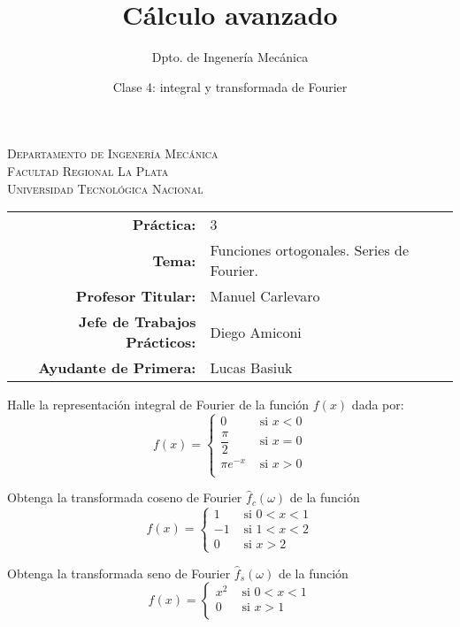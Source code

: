 \documentclass[11pt]{article}
\title{Cálculo avanzado}
\author{Dpto. de Ingenería Mecánica}
\date{Clase 4: integral y transformada de Fourier}
\begin{document}

\begin{center}
\end{center} 

\begin{center}
\vspace{\baselineskip}
\Large{\textsc{Departamento de Ingenería Mecánica}} \\
\textsc{Facultad Regional La Plata} \\
\textsc{Universidad Tecnológica Nacional}
\end{center}


\begin{center}
\begin{tabular}{r l}
    \textbf{Práctica:} & 3 \\
 \textbf{Tema:} & Funciones ortogonales. Series de Fourier. \\
 \textbf{Profesor Titular:} & Manuel Carlevaro \\
 \textbf{Jefe de Trabajos Prácticos:} & Diego Amiconi \\
 \textbf{Ayudante de Primera:} & Lucas Basiuk 
\end{tabular}\end{center}

\vspace{1em}

\begin{question} %
Halle la representación integral de Fourier de la función $f(x)$ dada por:
\[ f(x) = 
    \begin{cases}
    0 & \text{ si } x < 0 \\
    \dfrac{\pi}{2} & \text{ si } x = 0 \\
    \pi e^{-x} & \text{ si } x > 0 \\
\end{cases} \]
\end{question}


\begin{question} %
Obtenga la transformada coseno de Fourier $\hat{f}_c(\omega)$ de la función
\[ f(x) = 
\begin{cases}
    1 & \text{ si } 0 < x < 1 \\
    -1 & \text{ si } 1 < x < 2 \\
    0 & \text{ si } x > 2 
\end{cases} \]
\end{question}


\begin{question} %
Obtenga la transformada seno de Fourier $\hat{f}_s(\omega)$ de la función
\[ f(x) = 
\begin{cases}
    x^2 & \text{ si } 0 < x < 1 \\
    0 & \text{ si } x > 1 \\
\end{cases} \]
\end{question}
\end{document}

